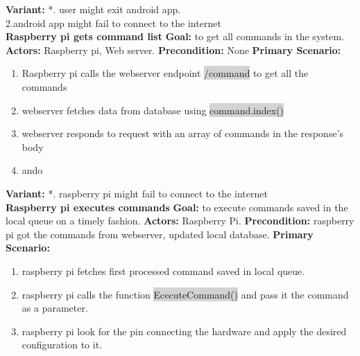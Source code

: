 \documentclass[12pt, oneside, a4paper]{book}
\newcommand{\code}[1]{{\color{red}\colorbox{lightgray}{#1}}}
\newcommand\boldcolor[1]{\textcolor{bold}{\textbf{#1}}}
\begin{document}
				\textbf{Variant:}\newline
				\hspace*{5mm}*. user might exit android app. \\
				\hspace*{5mm}2.android app might fail to connect to the internet \\
				\newline\boldcolor{Raspberry pi gets command list}
				\newline\textbf{Goal:} to get all commands in the system.
				\newline\textbf{Actors:} Raspberry pi, Web server.
				\newline\textbf{Precondition:} None
				\newline\textbf{Primary Scenario:}	
				\begin{enumerate}[label*=\arabic*.]
					\item Raspberry pi calls the webserver endpoint \code{/command} to get all the commands
					\item webserver fetches data from database using \code{command.index()}
					\item webserver responds to request with an array of commands in the response's body
					\item ando
				\end{enumerate}
				\textbf{Variant:}\newline
				\hspace*{5mm}*. raspberry pi might fail to connect to the internet \\
				\newline\boldcolor{Raspberry pi executes commands}
				\newline\textbf{Goal:} to execute commands saved in the local queue on a timely fashion.
				\newline\textbf{Actors:} Raspberry Pi.	
				\newline\textbf{Precondition:} raspberry pi got the commands from webserver, updated local database.
				\newline\textbf{Primary Scenario:}	
				\begin{enumerate}[label*=\arabic*.]
					\item raspberry pi fetches first processed command saved in local queue.
					\item raspberry pi calls the function \code{EcecuteCommand()} and pass it the command as a parameter.
					\item raspberry pi look for the pin connecting the hardware and apply the desired configuration to it.
				\end{enumerate}
\end{document}
